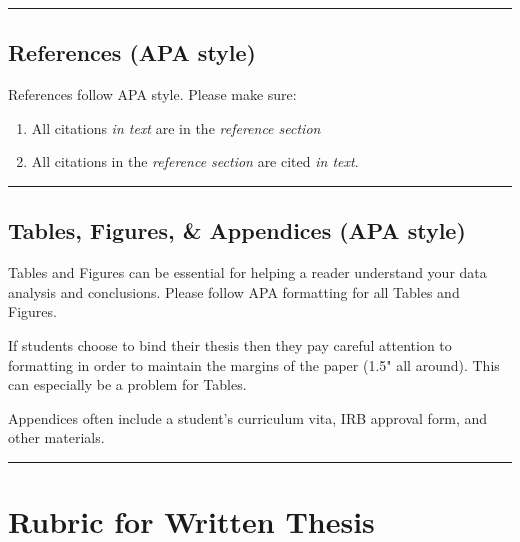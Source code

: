 \documentclass[
  openany]{book}
\providecommand{\tightlist}{%
  \setlength{\itemsep}{0pt}\setlength{\parskip}{0pt}}
\begin{document}
\begin{center}\rule{0.5\linewidth}{0.5pt}\end{center}

\hypertarget{references-apa-style}{%
\section{References (APA style)}\label{references-apa-style}}

References follow APA style. Please make sure:

\begin{enumerate}
\def\labelenumi{\arabic{enumi}.}
\tightlist
\item
  All citations \emph{in text} are in the \emph{reference section}
\item
  All citations in the \emph{reference section} are cited \emph{in text}.
\end{enumerate}

\begin{center}\rule{0.5\linewidth}{0.5pt}\end{center}

\hypertarget{tables-figures-appendices-apa-style}{%
\section{Tables, Figures, \& Appendices (APA style)}\label{tables-figures-appendices-apa-style}}

Tables and Figures can be essential for helping a reader understand your data analysis and conclusions. Please follow APA formatting for all Tables and Figures.

If students choose to bind their thesis then they pay careful attention to formatting in order to maintain the margins of the paper (1.5" all around). This can especially be a problem for Tables.

Appendices often include a student's curriculum vita, IRB approval form, and other materials.

\begin{center}\rule{0.5\linewidth}{0.5pt}\end{center}

\hypertarget{rubric-for-written-thesis}{%
\chapter{Rubric for Written Thesis}\label{rubric-for-written-thesis}}
\end{document}
